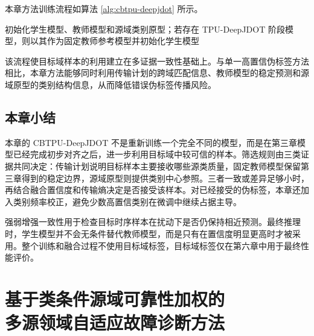 \documentclass{seuthesis-2022}
\begin{document}
本章方法训练流程如算法 \ref{alg:cbtpu-deepjdot} 所示。
\begin{algorithm}[!htbp]
    \caption{多证据置信均衡伪标签训练流程}
    \label{alg:cbtpu-deepjdot}
    初始化学生模型、教师模型和源域类别原型；若存在 TPU-DeepJDOT 阶段模型，则以其作为固定教师参考模型并初始化学生模型\;
\end{algorithm}

该流程使目标域样本的利用建立在多证据一致性基础上。与单一高置信伪标签方法相比，本章方法能够同时利用传输计划的跨域匹配信息、教师模型的稳定预测和源域原型的类别结构信息，从而降低错误伪标签传播风险。

\section{本章小结}

本章的 CBTPU-DeepJDOT 不是重新训练一个完全不同的模型，而是在第三章模型已经完成初步对齐之后，进一步利用目标域中较可信的样本。筛选规则由三类证据共同决定：传输计划说明目标样本主要接收哪些源类质量，固定教师模型保留第三章得到的稳定边界，源域原型则提供类别中心参照。三者一致或差异足够小时，再结合融合置信度和传输熵决定是否接受该样本。对已经接受的伪标签，本章还加入类别频率校正，避免少数高置信类别在微调中继续占据主导。

强弱增强一致性用于检查目标时序样本在扰动下是否仍保持相近预测。最终推理时，学生模型并不会无条件替代教师模型，而是只有在置信度明显更高时才被采用。整个训练和融合过程不使用目标域标签，目标域标签仅在第六章中用于最终性能评价。

\chapter[基于类条件源域可靠性加权的多源领域自适应故障诊断方法]{基于类条件源域可靠性加权的\\多源领域自适应故障诊断方法}
\end{document}
